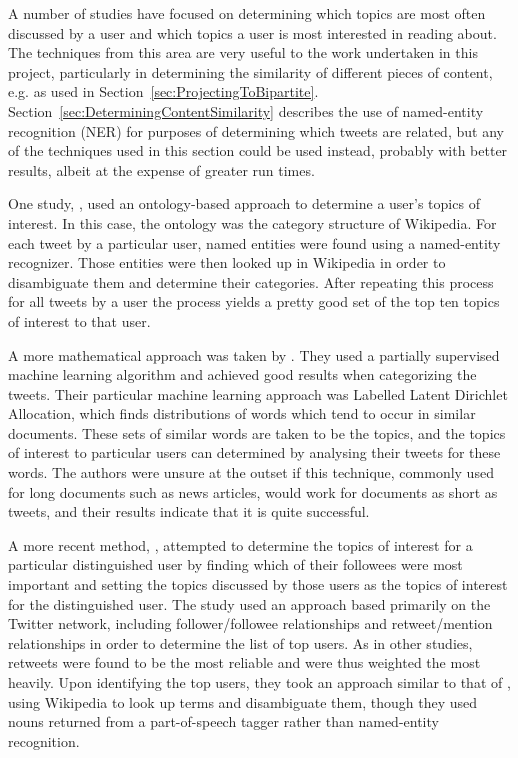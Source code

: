 A number of studies have focused on determining which topics are most often discussed by a user and which topics a user is most interested in reading about. The techniques from this area are very useful to the work undertaken in this project, particularly in determining the similarity of different pieces of content, e.g. as used in Section~\ref{sec:ProjectingToBipartite}. Section~\ref{sec:DeterminingContentSimilarity} describes the use of named-entity recognition (NER) for purposes of determining which tweets are related, but any of the techniques used in this section could be used instead, probably with better results, albeit at the expense of greater run times.

One study, \cite{Michelson2010}, used an ontology-based approach to determine a user's topics of interest. In this case, the ontology was the category structure of Wikipedia. For each tweet by a particular user, named entities were found using a named-entity recognizer. Those entities were then looked up in Wikipedia in order to disambiguate them and determine their categories. After repeating this process for all tweets by a user the process yields a pretty good set of the top ten topics of interest to that user.

A more mathematical approach was taken by \cite{Ramage2010}. They used a partially supervised machine learning algorithm and achieved good results when categorizing the tweets. Their particular machine learning approach was Labelled Latent Dirichlet Allocation, which finds distributions of words which tend to occur in similar documents. These sets of similar words are taken to be the topics, and the topics of interest to particular users can determined by analysing their tweets for these words. The authors were unsure at the outset if this technique, commonly used for long documents such as news articles, would work for documents as short as tweets, and their results indicate that it is quite successful.

A more recent method, \cite{Pochampally2011}, attempted to determine the topics of interest for a particular distinguished user by finding which of their followees were most important and setting the topics discussed by those users as the topics of interest for the distinguished user. The study used an approach based primarily on the Twitter network, including follower/followee relationships and retweet/mention relationships in order to determine the list of top users. As in other studies, retweets were found to be the most reliable and were thus weighted the most heavily. Upon identifying the top users, they took an approach similar to that of \cite{Michelson2010}, using Wikipedia to look up terms and disambiguate them, though they used nouns returned from a part-of-speech tagger rather than named-entity recognition.


